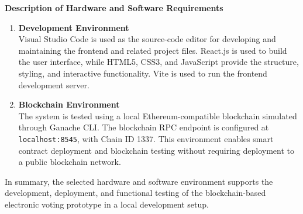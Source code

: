 \documentclass[12pt,a4paper]{report}
\begin{document}
\begingroup
\fontsize{7.5pt}{8.5pt}\selectfont
\noindent\textbf{Description of Hardware and Software Requirements}

\noindent\begin{minipage}[t]{0.48\textwidth}
\begin{enumerate}
    \setlength{\itemsep}{4pt}
    \setlength{\parskip}{0pt}
    \item \textbf{Development Environment}\\
    Visual Studio Code is used as the source-code editor for developing and maintaining the frontend and related project files. React.js is used to build the user interface, while HTML5, CSS3, and JavaScript provide the structure, styling, and interactive functionality. Vite is used to run the frontend development server.

    \item \textbf{Blockchain Environment}\\
    The system is tested using a local Ethereum-compatible blockchain simulated through Ganache CLI. The blockchain RPC endpoint is configured at \texttt{localhost:8545}, with Chain ID 1337. This environment enables smart contract deployment and blockchain testing without requiring deployment to a public blockchain network.
\end{enumerate}

\vspace{2pt}
\noindent In summary, the selected hardware and software environment supports the development, deployment, and functional testing of the blockchain-based electronic voting prototype in a local development setup.
\end{minipage}\hfill
\end{document}
